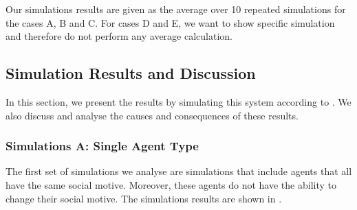 Our simulations results are given as the average over 10 repeated simulations for the cases A, B and C. For cases D and E, we want to show specific simulation and therefore do not perform any average calculation.

\subsection{Simulation Results and Discussion}\label{simulation_results_sub}



In this section, we present the results by simulating this system according to . We also discuss and analyse the causes and consequences of these results.


\subsubsection{Simulations A: Single Agent Type} \label{sec:simA}

The first set of simulations we analyse are simulations that include agents that all have the same social motive. Moreover, these agents do not have the ability to change their social motive. The simulations results are shown in .

